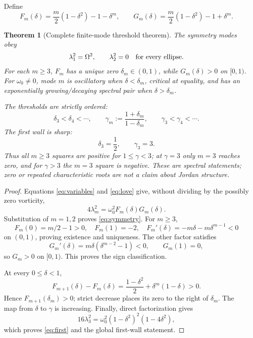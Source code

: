 \documentclass[10pt]{article}
\newtheorem{theorem}{Theorem}
\begin{document}
Define
\begin{equation}\label{eq:FG}
 F_m(\delta)=\frac m2(1-\delta^2)-1-\delta^m,
 \qquad
 G_m(\delta)=\frac m2(1-\delta^2)-1+\delta^m.
\end{equation}

\begin{theorem}[Complete finite-mode threshold theorem]\label{thm:wall}
The symmetry modes obey
\begin{equation}\label{eq:symmetry}
 \lambda_1^2=\Omega^2,\qquad \lambda_2^2=0
 \quad\hbox{for every ellipse}.
\end{equation}
For each $m\ge3$, $F_m$ has a unique zero $\delta_m\in(0,1)$, while
$G_m(\delta)>0$ on $[0,1)$.  For $\omega_0\ne0$, mode $m$ is oscillatory
when $\delta<\delta_m$, critical at equality, and has an exponentially
growing/decaying spectral pair when $\delta>\delta_m$.

The thresholds are strictly ordered:
\begin{equation}\label{eq:ordered}
 \delta_3<\delta_4<\cdots,\qquad
 \gamma_m:=\frac{1+\delta_m}{1-\delta_m},\qquad
 \gamma_3<\gamma_4<\cdots.
\end{equation}
The first wall is sharp:
\begin{equation}\label{eq:first}
 \delta_3=\frac12,\qquad \gamma_3=3.
\end{equation}
Thus all $m\ge3$ squares are positive for $1\le\gamma<3$; at $\gamma=3$
only $m=3$ reaches zero, and for $\gamma>3$ the $m=3$ square is negative.
These are spectral statements; zero or repeated characteristic roots are
not a claim about Jordan structure.
\end{theorem}

\begin{proof}
Equations \eqref{eq:variables} and \eqref{eq:love} give, without dividing by
the possibly zero vorticity,
\begin{equation}\label{eq:factor}
 4\lambda_m^2=\omega_0^2F_m(\delta)G_m(\delta).
\end{equation}
Substitution of $m=1,2$ proves \eqref{eq:symmetry}.  For $m\ge3$,
\[
 F_m(0)=m/2-1>0,\quad F_m(1)=-2,\quad
 F_m'(\delta)=-m\delta-m\delta^{m-1}<0
\]
on $(0,1)$, proving existence and uniqueness.  The other factor satisfies
\begin{equation}\label{eq:G}
 G_m'(\delta)=m\delta(\delta^{m-2}-1)<0,\qquad G_m(1)=0,
\end{equation}
so $G_m>0$ on $[0,1)$.  This proves the sign classification.

At every $0\le\delta<1$,
\begin{equation}\label{eq:difference}
 F_{m+1}(\delta)-F_m(\delta)
 =\frac{1-\delta^2}{2}+\delta^m(1-\delta)>0.
\end{equation}
Hence $F_{m+1}(\delta_m)>0$; strict decrease places its zero to the right of
$\delta_m$.  The map from $\delta$ to $\gamma$ is increasing.  Finally,
direct factorization gives
\begin{equation}\label{eq:m3}
 16\lambda_3^2
 =\omega_0^2(1-\delta^2)^2(1-4\delta^2),
\end{equation}
which proves \eqref{eq:first} and the global first-wall statement.
\end{proof}
\fi
\end{document}
